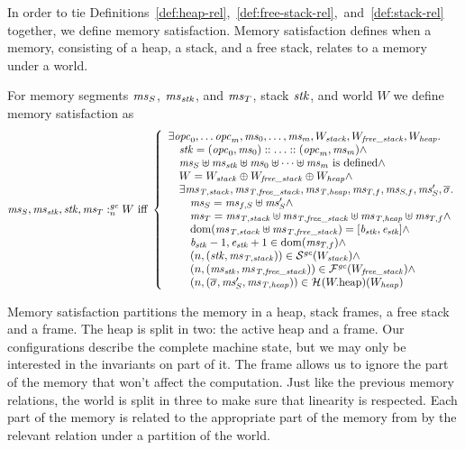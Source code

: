 \begin{jversion}
In order to tie Definitions~\ref{def:heap-rel},~\ref{def:free-stack-rel},~and~\ref{def:stack-rel} together, we define memory satisfaction.
Memory satisfaction defines when a \srccm{} memory, consisting of a heap, a stack, and a free stack, relates to a \trgcm{} memory under a world.
\begin{definition}
  For memory segments $\mathit{ms}_S$, $\mathit{ms}_{\mathit{stk}}$, and $\mathit{ms}_T$, stack $\mathit{stk}$, and world $W$ we define memory satisfaction as
\[
  \mathit{ms}_S,\mathit{ms}_{\mathit{stk}},\mathit{stk},\mathit{ms}_T :_{n}^{\mathit{gc}}W \text{ iff } 
  \left\{
    \begin{array}{l}
      \exists \mathit{opc}_0, \dots \mathit{opc}_m, \mathit{ms}_0, \dots, \mathit{ms}_m, W_{\mathit{stack}}, W_{\mathit{free\_stack}}, W_{\mathit{heap}} \ldotp\\
      \quad \mathit{stk} = (\mathit{opc}_0,\mathit{ms}_0):: \dots :: (\mathit{opc}_m,\mathit{ms}_m) \wedge \\
      \quad \mathit{ms}_S \uplus \mathit{ms}_{\mathit{stk}} \uplus \mathit{ms}_0 \uplus \dots \uplus \mathit{ms}_m  \text{ is defined} \wedge\\
      \quad W = W_{\mathit{stack}} \oplus W_{\mathit{free\_stack}} \oplus W_{\mathit{heap}} \wedge\\
      \quad\exists \mathit{ms}_{\mathit{T,stack}}, \mathit{ms}_{\mathit{T,free\_stack}}, \mathit{ms}_{\mathit{T,heap}}, \mathit{ms}_{T,f}, \mathit{ms}_{S,f}, \mathit{ms}_S',\overline{\sigma}\ldotp \\
      \qquad \mathit{ms}_S = \mathit{ms}_{f,S} \uplus \mathit{ms}_S' \wedge \\
      \qquad \mathit{ms}_T = \mathit{ms}_{\mathit{T,stack}} \uplus \mathit{ms}_{\mathit{T,free\_stack}} \uplus \mathit{ms}_{\mathit{T,heap}} \uplus \mathit{ms}_{T,f} \wedge \\
      \qquad \mathrm{dom}(\mathit{ms}_{\mathit{T,stack}} \uplus \mathit{ms}_{\mathit{T,free\_stack}}) = [\mathit{b}_{\mathit{stk}},\mathit{e}_{\mathit{stk}}] \wedge \\
      \qquad \mathit{b}_{\mathit{stk}} -1,\mathit{e}_{\mathit{stk}} + 1 \in \mathrm{dom}(\mathit{ms}_{T,f}) \wedge \\
      \qquad \left(n,(\mathit{stk},\mathit{ms}_{\mathit{T,stack}})\right) \in \mathcal{S}^{\mathit{gc}}(W_{\mathit{stack}}) \wedge \\
      \qquad \left(n,(\mathit{ms}_{\mathit{stk}},\mathit{ms}_{\mathit{T,free\_stack}})\right) \in \mathcal{F}^{\mathit{gc}}(W_{\mathit{free\_stack}}) \wedge \\
      \qquad \left(n,(\overline{\sigma},\mathit{ms}_S',\mathit{ms}_{\mathit{T,heap}})\right) \in \mathcal{H}^{}(W.\mathrm{heap})(W_{\mathit{heap}})
    \end{array}
  \right.
\]
\end{definition}
Memory satisfaction partitions the \trgcm{} memory in a heap, stack frames, a free stack and a frame.
The \srccm{} heap is split in two: the active heap and a frame.
Our configurations describe the complete machine state, but we may only be interested in the invariants on part of it.
The frame allows us to ignore the part of the memory that won't affect the computation.
Just like the previous memory relations, the world is split in three to make sure that linearity is respected.
Each part of the \srccm{} memory is related to the appropriate part of the memory from \trgcm{} by the relevant relation under a partition of the world.


\end{jversion}
